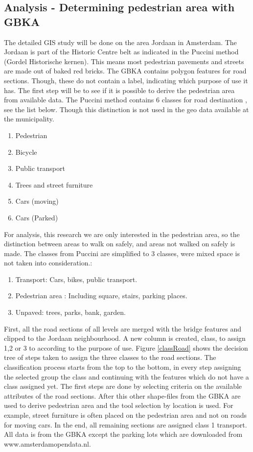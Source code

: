 \subsection{Analysis - Determining pedestrian area with GBKA}

The detailed GIS study will be done on the area Jordaan in Amsterdam. The Jordaan is part of the Historic Centre belt as indicated in the Puccini method (Gordel Historische kernen). This means most pedestrian pavements and streets are made out of baked red bricks\cite{puccini2014}.
The GBKA contains polygon features for road sections. Though, these do not contain a label, indicating which purpose of use it has\cite{gbka}. The first step will be to see if it is possible to derive the pedestrian area from available data. The Puccini method contains 6 classes for road destination \cite{puccini2014}, see the list below. Though this distinction is not used in the geo data available at the municipality.

\begin{enumerate}
\item Pedestrian
\item Bicycle
\item Public transport
\item Trees and street furniture
\item Cars (moving)
\item Cars (Parked)
\end{enumerate}

For analysis, this research we are only interested in the pedestrian area, so the distinction between areas to walk on safely, and areas not walked on safely is made. The classes from Puccini are simplified to 3 classes, were mixed space is not taken into consideration.:
\begin{enumerate}
\item Transport: Cars, bikes, public transport. 
\item Pedestrian area : Including square, stairs, parking places. 
\item Unpaved: trees, parks, bank, garden.
\end{enumerate}

First, all the road sections of all levels are merged with the bridge features and clipped to the Jordaan neighbourhood. A new column is created, class, to assign 1,2 or 3 to according to the purpose of use. 
Figure \ref{classRoad} shows the decision tree of steps taken to assign the three classes to the road sections. The classification process starts from the top to the bottom, in every step assigning the selected group the class and continuing with the features which do not have a class assigned yet. The first steps are done by selecting criteria on the available attributes of the road sections. After this other shape-files from the GBKA are used to derive pedestrian area and the tool selection by location is used. For example, street furniture is often placed on the pedestrian area and not on roads for moving cars. In the end, all remaining sections are assigned class 1 transport. All data is from the GBKA except the parking lots which are downloaded from www.amsterdamopendata.nl. 

